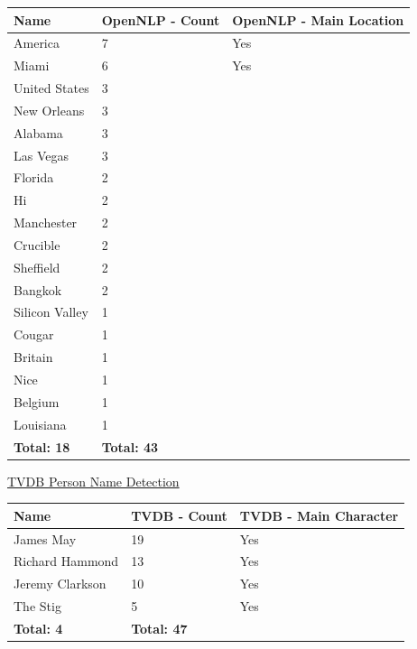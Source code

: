 \begin{center}
\begin{tabular}{|p{120pt}|p{90pt}|p{180pt}|}
\hline
\textbf{Name}			&\textbf{OpenNLP - Count}	&\textbf{OpenNLP - Main Location}
\\\hline
America				&7				&Yes
\\\hline
Miami				&6				&Yes
\\\hline
United States			&3				&
\\\hline
New Orleans			&3				&	
\\\hline
Alabama				&3				&
\\\hline
Las Vegas				&3				&	
\\\hline
Florida				&2				&	
\\\hline
Hi					&2				&	
\\\hline
Manchester			&2				&	
\\\hline
Crucible				&2				&	
\\\hline
Sheffield				&2				&	
\\\hline
Bangkok				&2				&	
\\\hline
Silicon Valley			&1				&	
\\\hline
Cougar				&1				&	
\\\hline
Britain				&1				&	
\\\hline
Nice					&1				&	
\\\hline
Belgium				&1				&	
\\\hline
Louisiana				&1				&	
\\\hline
\textbf{Total: 18}		&\textbf{Total: 43}	&	
\\\hline
\end{tabular}
\end{center}

\underline{TVDB Person Name Detection}
\begin{center}
\begin{tabular}{|p{120pt}|p{90pt}|p{180pt}|}
\hline
\textbf{Name}			&\textbf{TVDB - Count}	&\textbf{TVDB - Main Character}
\\\hline
James May			&19				&Yes
\\\hline
Richard Hammond		&13				&Yes
\\\hline
Jeremy Clarkson		&10				&Yes
\\\hline
The Stig				&5				&Yes
\\\hline
\textbf{Total: 4}		&\textbf{Total: 47} 	&
\\\hline
\end{tabular}
\end{center}

